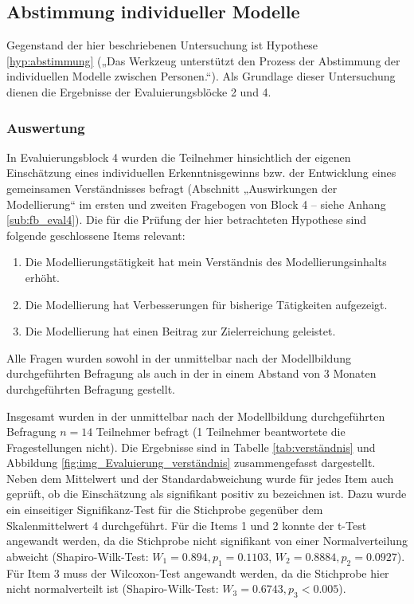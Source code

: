 \subsection{Abstimmung individueller Modelle} %
\label{sub:abstimmung_individueller_modelle}

Gegenstand der hier beschriebenen Untersuchung ist Hypothese \ref{hyp:abstimmung} („Das Werkzeug unterstützt den Prozess der Abstimmung der individuellen Modelle zwischen Personen.“). Als Grundlage dieser Untersuchung dienen die Ergebnisse der Evaluierungsblöcke 2 und 4.

\subsubsection{Auswertung} 

In Evaluierungsblock 4 wurden die Teilnehmer hinsichtlich der eigenen Einschätzung eines individuellen Erkenntnisgewinns bzw. der Entwicklung eines gemeinsamen Verständnisses befragt (Abschnitt „Auswirkungen der Modellierung“ im ersten und zweiten Fragebogen von Block 4  -- siehe Anhang \ref{sub:fb_eval4}). Die für die Prüfung der hier betrachteten Hypothese sind folgende geschlossene Items relevant:

\begin{enumerate}
	\item Die Modellierungstätigkeit hat mein Verständnis des Modellierungsinhalts erhöht.
	\item Die Modellierung hat Verbesserungen für bisherige Tätigkeiten aufgezeigt.
	\item Die Modellierung hat einen Beitrag zur Zielerreichung geleistet.
\end{enumerate}

Alle Fragen wurden sowohl in der unmittelbar nach der Modellbildung durchgeführten Befragung als auch in der in einem Abstand von 3 Monaten durchgeführten Befragung gestellt.

Insgesamt wurden in der unmittelbar nach der Modellbildung durchgeführten Befragung $n=14$ Teilnehmer befragt (1 Teilnehmer beantwortete die Fragestellungen nicht). Die Ergebnisse sind in Tabelle \ref{tab:verständnis} und Abbildung \ref{fig:img_Evaluierung_verständnis} zusammengefasst dargestellt. Neben dem Mittelwert und der Standardabweichung wurde für jedes Item auch geprüft, ob die Einschätzung als signifikant positiv zu bezeichnen ist. Dazu wurde ein einseitiger Signifikanz-Test für die Stichprobe gegenüber dem Skalenmittelwert 4 durchgeführt. Für die Items 1 und 2 konnte der t-Test angewandt werden, da die Stichprobe nicht signifikant von einer Normalverteilung abweicht (Shapiro-Wilk-Test: $W_{1}=0.894, p_{1}=0.1103$, $W_{2}=0.8884, p_{2}=0.0927$). Für Item 3 muss der Wilcoxon-Test angewandt werden, da die Stichprobe hier nicht normalverteilt ist (Shapiro-Wilk-Test: $W_{3}=0.6743, p_{3}<0.005$).

